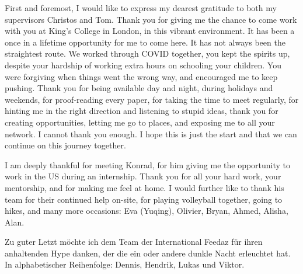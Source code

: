 First and foremost, I would like to express my dearest gratitude to both my supervisors Christos and Tom. Thank you for giving me the chance to come work with you at King's College in London, in this vibrant environment. It has been a once in a lifetime opportunity for me to come here. It has not always been the straightest route. We worked through COVID together, you kept the spirits up, despite your hardship of working extra hours on schooling your children. You were forgiving when things went the wrong way, and encouraged me to keep pushing. Thank you for being available day and night, during holidays and weekends, for proof-reading every paper, for taking the time to meet regularly, for hinting me in the right direction and listening to stupid ideas, thank you for creating opportunities, letting me go to places, and exposing me to all your network. I cannot thank you enough. I hope this is just the start and that we can continue on this journey together.







I am deeply thankful for meeting Konrad, for him giving me the opportunity to work in the US during an internship. Thank you for all your hard work, your mentorship, and for making me feel at home. I would further like to thank his team for their continued help on-site, for playing volleyball together, going to hikes, and many more occasions: Eva (Yuqing), Olivier, Bryan, Ahmed, Alisha, Alan.




Zu guter Letzt möchte ich dem Team der International Feedaz für ihren anhaltenden Hype danken, der die ein oder andere dunkle Nacht erleuchtet hat. In alphabetischer Reihenfolge: Dennis, Hendrik, Lukas und Viktor.
